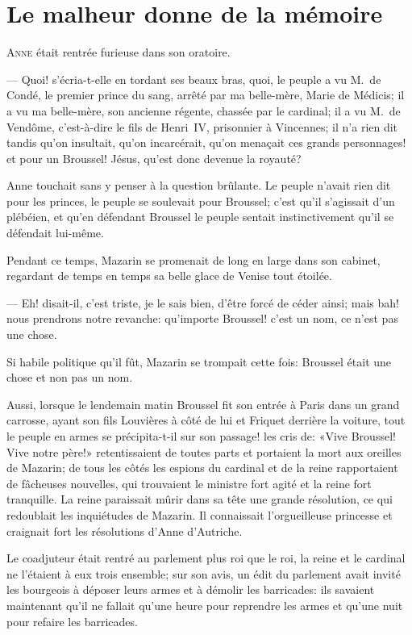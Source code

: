 \chapter{Le malheur donne de la mémoire}

\lettrine{A}{nne} était rentrée furieuse dans son oratoire.

\zz
— Quoi! s'écria-t-elle en tordant ses beaux bras, quoi, le peuple a vu M.~de Condé, le premier prince du sang, arrêté par ma belle-mère, Marie de Médicis; il a vu ma belle-mère, son ancienne régente, chassée par le cardinal; il a vu M.~de Vendôme, c'est-à-dire le fils de Henri~IV, prisonnier à Vincennes; il n'a rien dit tandis qu'on insultait, qu'on incarcérait, qu'on menaçait ces grands personnages! et pour un Broussel! Jésus, qu'est donc devenue la royauté?

Anne touchait sans y penser à la question brûlante. Le peuple n'avait rien dit pour les princes, le peuple se soulevait pour Broussel; c'est qu'il s'agissait d'un plébéien, et qu'en défendant Broussel le peuple sentait instinctivement qu'il se défendait lui-même.

Pendant ce temps, Mazarin se promenait de long en large dans son cabinet, regardant de temps en temps sa belle glace de Venise tout étoilée.

— Eh! disait-il, c'est triste, je le sais bien, d'être forcé de céder ainsi; mais bah! nous prendrons notre revanche: qu'importe Broussel! c'est un nom, ce n'est pas une chose.

Si habile politique qu'il fût, Mazarin se trompait cette fois: Broussel était une chose et non pas un nom.

Aussi, lorsque le lendemain matin Broussel fit son entrée à Paris dans un grand carrosse, ayant son fils Louvières à côté de lui et Friquet derrière la voiture, tout le peuple en armes se précipita-t-il sur son passage! les cris de: «Vive Broussel! Vive notre père!» retentissaient de toutes parts et portaient la mort aux oreilles de Mazarin; de tous les côtés les espions du cardinal et de la reine rapportaient de fâcheuses nouvelles, qui trouvaient le ministre fort agité et la reine fort tranquille. La reine paraissait mûrir dans sa tête une grande résolution, ce qui redoublait les inquiétudes de Mazarin. Il connaissait l'orgueilleuse princesse et craignait fort les résolutions d'Anne d'Autriche.

Le coadjuteur était rentré au parlement plus roi que le roi, la reine et le cardinal ne l'étaient à eux trois ensemble; sur son avis, un édit du parlement avait invité les bourgeois à déposer leurs armes et à démolir les barricades: ils savaient maintenant qu'il ne fallait qu'une heure pour reprendre les armes et qu'une nuit pour refaire les barricades.


